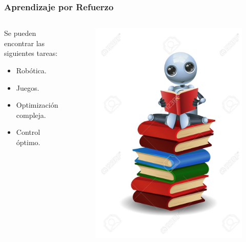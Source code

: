 \documentclass[10pt]{beamer}
\begin{document}
\begin{frame}
    \frametitle{Aprendizaje por Refuerzo}
    \begin{columns}
        \begin{column}{0.5\textwidth}
            Se pueden encontrar las siguientes tareas:
          \begin{itemize}
              \item Robótica.
              \item Juegos.
              \item Optimización compleja.
              \item Control óptimo.
          \end{itemize}
        \end{column}
        \begin{column}{0.5\textwidth}
          \begin{figure}[!h] 
            \centering
            \includegraphics[width=1\textwidth]{img/robot2}
          \end{figure}  
        \end{column}
      \end{columns}

\end{frame}
\end{document}
